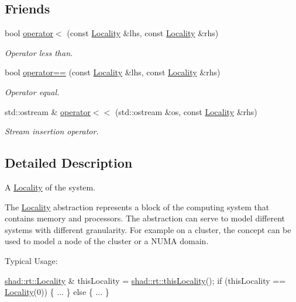 \subsection*{Friends}
\begin{DoxyCompactItemize}
\item 
bool \hyperlink{classshad_1_1rt_1_1Locality_aa2af2d26e5ccf12173f47700f758ef33}{operator$<$} (const \hyperlink{classshad_1_1rt_1_1Locality}{Locality} \&lhs, const \hyperlink{classshad_1_1rt_1_1Locality}{Locality} \&rhs)
\begin{DoxyCompactList}\small\item\em Operator less than. \end{DoxyCompactList}\item 
bool \hyperlink{classshad_1_1rt_1_1Locality_a5b49a8d953521ff207ca55d2b6c9d398}{operator==} (const \hyperlink{classshad_1_1rt_1_1Locality}{Locality} \&lhs, const \hyperlink{classshad_1_1rt_1_1Locality}{Locality} \&rhs)
\begin{DoxyCompactList}\small\item\em Operator equal. \end{DoxyCompactList}\item 
std\-::ostream \& \hyperlink{classshad_1_1rt_1_1Locality_af75b1b561cda1bea25ef3c2ff024e066}{operator$<$$<$} (std\-::ostream \&os, const \hyperlink{classshad_1_1rt_1_1Locality}{Locality} \&rhs)
\begin{DoxyCompactList}\small\item\em Stream insertion operator. \end{DoxyCompactList}\end{DoxyCompactItemize}


\subsection{Detailed Description}
A \hyperlink{classshad_1_1rt_1_1Locality}{Locality} of the system. 

The \hyperlink{classshad_1_1rt_1_1Locality}{Locality} abstraction represents a block of the computing system that contains memory and processors. The abstraction can serve to model different systems with different granularity. For example on a cluster, the concept can be used to model a node of the cluster or a N\-U\-M\-A domain.

Typical Usage\-: 
\begin{DoxyCode}
\hyperlink{classshad_1_1rt_1_1Locality}{shad::rt::Locality} & thisLocality = \hyperlink{namespaceshad_1_1rt_a7536c33738a5dd285f3a44aa6a199faf}{shad::rt::thisLocality}();
\textcolor{keywordflow}{if} (thisLocality == \hyperlink{classshad_1_1rt_1_1Locality_afe112bd31569e69f87e20b98e3a67695}{Locality}(0)) \{
...
\} \textcolor{keywordflow}{else} \{
...
\}
\end{DoxyCode}
 

